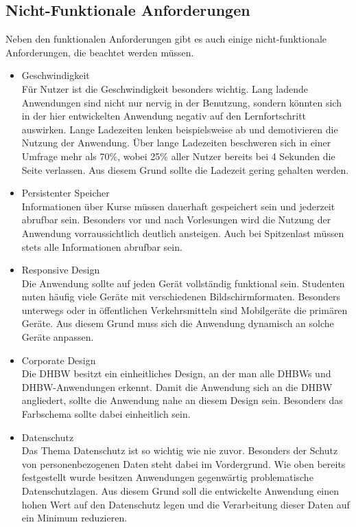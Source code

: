 \subsection{Nicht-Funktionale Anforderungen}
Neben den funktionalen Anforderungen gibt es auch einige nicht-funktionale Anforderungen, die beachtet werden müssen.
\begin{itemize}
    \item Geschwindigkeit\\
        Für Nutzer ist die Geschwindigkeit besonders wichtig.
        Lang ladende Anwendungen sind nicht nur nervig in der Benutzung, sondern könnten sich in der hier entwickelten Anwendung negativ auf den Lernfortschritt auswirken. Lange Ladezeiten lenken beispielsweise ab und demotivieren die Nutzung der Anwendung.
        Über lange Ladezeiten beschweren sich in einer Umfrage mehr als 70\%, wobei 25\% aller Nutzer bereits bei 4 Sekunden die Seite verlassen.\autocite{loadingTimes}
        Aus diesem Grund sollte die Ladezeit gering gehalten werden.
    \item Persistenter Speicher             \\
        Informationen über Kurse müssen dauerhaft gespeichert sein und jederzeit abrufbar sein.
        Besonders vor und nach Vorlesungen wird die Nutzung der Anwendung vorraussichtlich deutlich ansteigen.
        Auch bei Spitzenlast müssen stets alle Informationen abrufbar sein.
    \item Responsive Design\\
        Die Anwendung sollte auf jeden Gerät vollständig funktional sein.
        Studenten nuten häufig viele Geräte mit verschiedenen Bildschirmformaten.
        Besonders unterwegs oder in öffentlichen Verkehrsmitteln sind Mobilgeräte die primären Geräte.
        Aus diesem Grund muss sich die Anwendung dynamisch an solche Geräte anpassen.
    \item Corporate Design\\
        Die DHBW besitzt ein einheitliches Design, an der man alle DHBWs und DHBW-Anwendungen erkennt.
        Damit die Anwendung sich an die DHBW angliedert, sollte die Anwendung nahe an diesem Design sein.
        Besonders das Farbschema sollte dabei einheitlich sein. %
    \item Datenschutz\\
        Das Thema Datenschutz ist so wichtig wie nie zuvor.
        Besonders der Schutz von personenbezogenen Daten steht dabei im Vordergrund.
        Wie oben bereits festgestellt wurde besitzen Anwendungen gegenwärtig problematische Datenschutzlagen.
        Aus diesem Grund soll die entwickelte Anwendung einen hohen Wert auf den Datenschutz legen und die Verarbeitung dieser Daten auf ein Minimum reduzieren.
\end{itemize}



